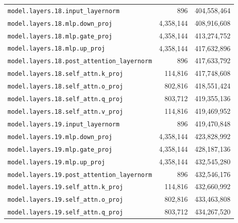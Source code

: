 \documentclass[10pt,a4paper]{article}
\theoremstyle{definition}
\begin{document}
\begin{appendices}
\begin{longtable}{p{9.5cm}rr}
\texttt{model.\allowbreak{}layers.\allowbreak{}18.\allowbreak{}input\_layernorm} & 896 & 404,558,464 \\
\texttt{model.\allowbreak{}layers.\allowbreak{}18.\allowbreak{}mlp.\allowbreak{}down\_proj} & 4,358,144 & 408,916,608 \\
\texttt{model.\allowbreak{}layers.\allowbreak{}18.\allowbreak{}mlp.\allowbreak{}gate\_proj} & 4,358,144 & 413,274,752 \\
\texttt{model.\allowbreak{}layers.\allowbreak{}18.\allowbreak{}mlp.\allowbreak{}up\_proj} & 4,358,144 & 417,632,896 \\
\texttt{model.\allowbreak{}layers.\allowbreak{}18.\allowbreak{}post\_attention\_layernorm} & 896 & 417,633,792 \\
\texttt{model.\allowbreak{}layers.\allowbreak{}18.\allowbreak{}self\_attn.\allowbreak{}k\_proj} & 114,816 & 417,748,608 \\
\texttt{model.\allowbreak{}layers.\allowbreak{}18.\allowbreak{}self\_attn.\allowbreak{}o\_proj} & 802,816 & 418,551,424 \\
\texttt{model.\allowbreak{}layers.\allowbreak{}18.\allowbreak{}self\_attn.\allowbreak{}q\_proj} & 803,712 & 419,355,136 \\
\texttt{model.\allowbreak{}layers.\allowbreak{}18.\allowbreak{}self\_attn.\allowbreak{}v\_proj} & 114,816 & 419,469,952 \\
\texttt{model.\allowbreak{}layers.\allowbreak{}19.\allowbreak{}input\_layernorm} & 896 & 419,470,848 \\
\texttt{model.\allowbreak{}layers.\allowbreak{}19.\allowbreak{}mlp.\allowbreak{}down\_proj} & 4,358,144 & 423,828,992 \\
\texttt{model.\allowbreak{}layers.\allowbreak{}19.\allowbreak{}mlp.\allowbreak{}gate\_proj} & 4,358,144 & 428,187,136 \\
\texttt{model.\allowbreak{}layers.\allowbreak{}19.\allowbreak{}mlp.\allowbreak{}up\_proj} & 4,358,144 & 432,545,280 \\
\texttt{model.\allowbreak{}layers.\allowbreak{}19.\allowbreak{}post\_attention\_layernorm} & 896 & 432,546,176 \\
\texttt{model.\allowbreak{}layers.\allowbreak{}19.\allowbreak{}self\_attn.\allowbreak{}k\_proj} & 114,816 & 432,660,992 \\
\texttt{model.\allowbreak{}layers.\allowbreak{}19.\allowbreak{}self\_attn.\allowbreak{}o\_proj} & 802,816 & 433,463,808 \\
\texttt{model.\allowbreak{}layers.\allowbreak{}19.\allowbreak{}self\_attn.\allowbreak{}q\_proj} & 803,712 & 434,267,520 \\

\end{longtable}
\end{appendices}
\end{document}
